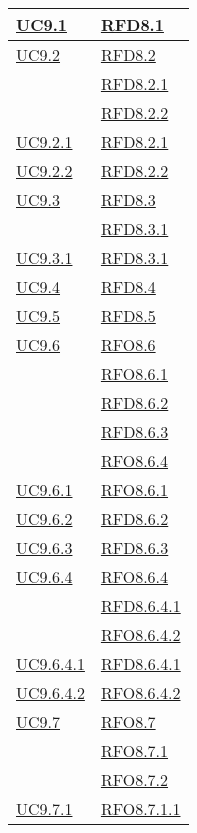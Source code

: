 \begin{longtable}{|>{\centering}m{5cm}|m{5cm}<{\centering}|}
\hyperref[UC9.1]{UC9.1} & \hyperlink{RFD8.1}{RFD8.1}\\ \hline
\hyperref[UC9.2]{UC9.2} & \hyperlink{RFD8.2}{RFD8.2}\\
& \hyperlink{RFD8.2.1}{RFD8.2.1}\\
& \hyperlink{RFD8.2.2}{RFD8.2.2}\\ \hline
\hyperref[UC9.2.1]{UC9.2.1} & \hyperlink{RFD8.2.1}{RFD8.2.1}\\ \hline
\hyperref[UC9.2.2]{UC9.2.2} & \hyperlink{RFD8.2.2}{RFD8.2.2}\\ \hline
\hyperref[UC9.3]{UC9.3} & \hyperlink{RFD8.3}{RFD8.3}\\
& \hyperlink{RFD8.3.1}{RFD8.3.1}\\ \hline
\hyperref[UC9.3.1]{UC9.3.1} & \hyperlink{RFD8.3.1}{RFD8.3.1}\\ \hline
\hyperref[UC9.4]{UC9.4} & \hyperlink{RFD8.4}{RFD8.4}\\ \hline
\hyperref[UC9.5]{UC9.5} & \hyperlink{RFD8.5}{RFD8.5}\\ \hline
\hyperref[UC9.6]{UC9.6} & \hyperlink{RFO8.6}{RFO8.6}\\
& \hyperlink{RFO8.6.1}{RFO8.6.1}\\
& \hyperlink{RFD8.6.2}{RFD8.6.2}\\
& \hyperlink{RFD8.6.3}{RFD8.6.3}\\
& \hyperlink{RFO8.6.4}{RFO8.6.4}\\ \hline
\hyperref[UC9.6.1]{UC9.6.1} & \hyperlink{RFO8.6.1}{RFO8.6.1}\\ \hline
\hyperref[UC9.6.2]{UC9.6.2} & \hyperlink{RFD8.6.2}{RFD8.6.2}\\ \hline
\hyperref[UC9.6.3]{UC9.6.3} & \hyperlink{RFD8.6.3}{RFD8.6.3}\\ \hline
\hyperref[UC9.6.4]{UC9.6.4} & \hyperlink{RFO8.6.4}{RFO8.6.4}\\
& \hyperlink{RFD8.6.4.1}{RFD8.6.4.1}\\
& \hyperlink{RFO8.6.4.2}{RFO8.6.4.2}\\ \hline
\hyperref[UC9.6.4.1]{UC9.6.4.1} & \hyperlink{RFD8.6.4.1}{RFD8.6.4.1}\\ \hline
\hyperref[UC9.6.4.2]{UC9.6.4.2} & \hyperlink{RFO8.6.4.2}{RFO8.6.4.2}\\ \hline
\hyperref[UC9.7]{UC9.7} & \hyperlink{RFO8.7}{RFO8.7}\\
& \hyperlink{RFO8.7.1}{RFO8.7.1}\\
& \hyperlink{RFO8.7.2}{RFO8.7.2}\\ \hline
\hyperref[UC9.7.1]{UC9.7.1} & \hyperlink{RFO8.7.1.1}{RFO8.7.1.1}\\ \hline

\end{longtable}
